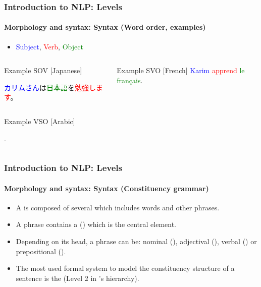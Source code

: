 \documentclass[xcolor=table]{beamer}
\begin{document}
\begin{frame}
\frametitle{Introduction to NLP: Levels}
\framesubtitle{Morphology and syntax: Syntax (Word order, examples)}

\begin{itemize}
	\item \textcolor{blue}{Subject}, \textcolor{red}{Verb}, \textcolor{green}{Object}
\end{itemize}

\begin{columns}
\begin{column}{0.52\textwidth}
	\begin{exampleblock}{Example SOV [Japanese]}
		\begin{CJK}{UTF8}{min}
			\textcolor{blue}{カリムさん}は\textcolor{green}{日本語}を\textcolor{red}{勉強します}。
		\end{CJK}
	\end{exampleblock}
\end{column}
%
\begin{column}{0.42\textwidth}
	\begin{exampleblock}{Example SVO [French]}
		\textcolor{blue}{Karim} \textcolor{red}{apprend} \textcolor{green}{le français}.
	\end{exampleblock}
\end{column}%
\end{columns}
\begin{columns}
\begin{column}{0.49\textwidth}
	\begin{exampleblock}{Example VSO [Arabic]}
		\begin{RLtext}
			  
			  
			.
		\end{RLtext}
	\end{exampleblock}
\end{column}
\end{columns}

\end{frame}

\begin{frame}
\frametitle{Introduction to NLP: Levels}
\framesubtitle{Morphology and syntax: Syntax (Constituency grammar)}

\begin{itemize}
	\item A  is composed of several  which includes words and other phrases.
	\item A phrase contains a  () which is the central element.
	\item Depending on its head, a phrase can be: nominal (), adjectival (), verbal () or prepositional ().
	\item The most used formal system to model the constituency structure of a sentence is the  (Level 2 in 's hierarchy).
\end{itemize}


\end{frame}
\end{document}
